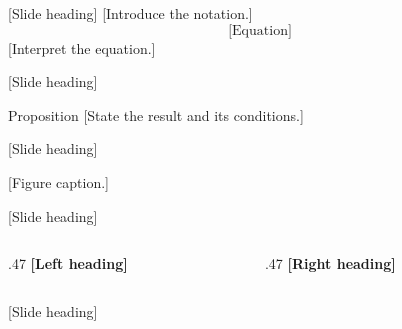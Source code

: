 
\begin{frame}{[Slide heading]}
  [Introduce the notation.]
  \[
    \text{[Equation]}
  \]
  [Interpret the equation.]
\end{frame}

\begin{frame}{[Slide heading]}
  \begin{block}{Proposition}
    [State the result and its conditions.]
  \end{block}
  \medskip
\end{frame}

\begin{frame}{[Slide heading]}
  \begin{center}
  \end{center}
  [Figure caption.]
\end{frame}

\begin{frame}{[Slide heading]}
  \begin{columns}[T,onlytextwidth]
    \begin{column}{.47\textwidth}
      \textbf{[Left heading]}\par{}
    \end{column}
    \begin{column}{.47\textwidth}
      \textbf{[Right heading]}\par{}
    \end{column}
  \end{columns}
\end{frame}

\begin{frame}{[Slide heading]}
  \begin{center}
  \end{center}
\end{frame}
